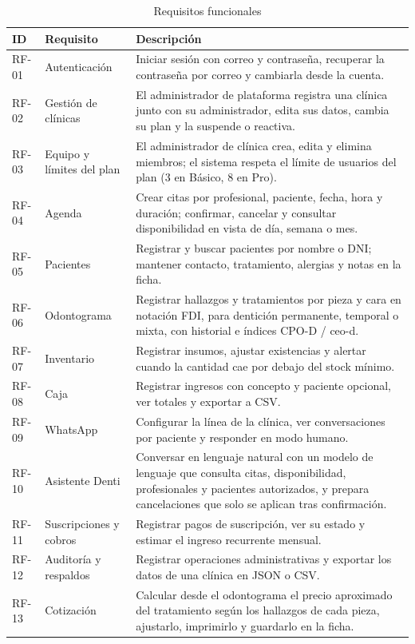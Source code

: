 \documentclass[11pt]{article}
\begin{document}
\begin{table}[H]
\centering\small
\caption{Requisitos funcionales}\label{tab:rf}
\begin{tabularx}{\linewidth}{@{}p{1.1cm}P{3.6cm}L@{}}
\toprule
\textbf{ID} & \textbf{Requisito} & \textbf{Descripción} \\
\midrule
RF-01 & Autenticación & Iniciar sesión con correo y contraseña, recuperar la contraseña por correo y cambiarla desde la cuenta. \\
RF-02 & Gestión de clínicas & El administrador de plataforma registra una clínica junto con su administrador, edita sus datos, cambia su plan y la suspende o reactiva. \\
RF-03 & Equipo y límites del plan & El administrador de clínica crea, edita y elimina miembros; el sistema respeta el límite de usuarios del plan (3 en Básico, 8 en Pro). \\
RF-04 & Agenda & Crear citas por profesional, paciente, fecha, hora y duración; confirmar, cancelar y consultar disponibilidad en vista de día, semana o mes. \\
RF-05 & Pacientes & Registrar y buscar pacientes por nombre o DNI; mantener contacto, tratamiento, alergias y notas en la ficha. \\
RF-06 & Odontograma & Registrar hallazgos y tratamientos por pieza y cara en notación FDI, para dentición permanente, temporal o mixta, con historial e índices CPO-D / ceo-d. \\
RF-07 & Inventario & Registrar insumos, ajustar existencias y alertar cuando la cantidad cae por debajo del stock mínimo. \\
RF-08 & Caja & Registrar ingresos con concepto y paciente opcional, ver totales y exportar a CSV. \\
RF-09 & WhatsApp & Configurar la línea de la clínica, ver conversaciones por paciente y responder en modo humano. \\
RF-10 & Asistente Denti & Conversar en lenguaje natural con un modelo de lenguaje que consulta citas, disponibilidad, profesionales y pacientes autorizados, y prepara cancelaciones que solo se aplican tras confirmación. \\
RF-11 & Suscripciones y cobros & Registrar pagos de suscripción, ver su estado y estimar el ingreso recurrente mensual. \\
RF-12 & Auditoría y respaldos & Registrar operaciones administrativas y exportar los datos de una clínica en JSON o CSV. \\
RF-13 & Cotización & Calcular desde el odontograma el precio aproximado del tratamiento según los hallazgos de cada pieza, ajustarlo, imprimirlo y guardarlo en la ficha. \\
\bottomrule
\end{tabularx}
\end{table}
\end{document}
